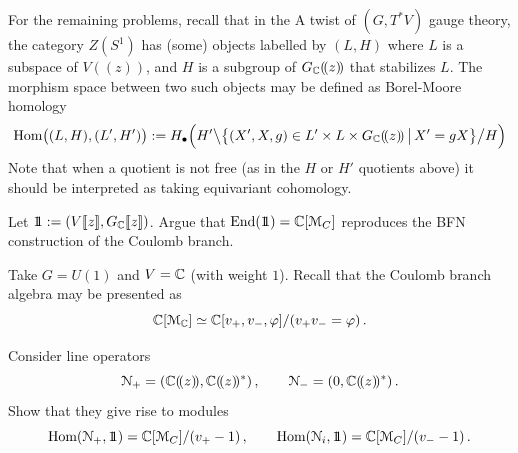 For the remaining problems, recall that in the A twist of $(G,T^*V)$ gauge theory, the category $Z(S^1)$ has (some) objects labelled by $(L,H)$ where $L$ is a subspace of $V(\!(z)\!)$, and $H$ is a subgroup of $G_{\mathbb{C}}(\!(z)\!)$ that stabilizes $L$. The morphism space between two such objects may be defined as Borel-Moore homology
%
$$ \text{Hom}\big((L,H),(L',H')\big) := H_\bullet\Big(  H'\big\backslash\big\{ (X',X,g)\in L'\times L\times G_{\mathbb{C}}(\!(z)\!)\,\big|\, X'=gX\big\}\big/H \Big) $$
%
Note that when a quotient is not free (as in the $H$ or $H'$ quotients above) it should be interpreted as taking equivariant cohomology.

\begin{exercise}

Let $1\!\!1 := (V[\![z]\!],G_{\mathbb{C}}[\![z]\!])$. Argue that $\text{End}(1\!\!1) = \mathbb{C}[\mathcal{M}_C]$ reproduces the BFN construction of the Coulomb branch.

\end{exercise}

\begin{exercise}
Take $G=U(1)$ and $V=\mathbb{C}$ (with weight $1$). Recall that the Coulomb branch algebra may be presented as
%
$$ \mathbb{C}[\mathcal{M}_{\mathbb{C}}] \simeq \mathbb{C}[v_+,v_-,\varphi]/(v_+v_-=\varphi)\,. $$
\end{exercise}
%
Consider line operators
%
$$ \mathcal{N}_+ = (\mathbb{C}(\!(z)\!),\mathbb{C}(\!(z)\!)^*)\,,\qquad  \mathcal{N}_- = (0,\mathbb{C}(\!(z)\!)^*)\,. $$
%
Show that they give rise to modules
%
$$ \text{Hom}(\mathcal{N}_+,1\!\!1) = \mathbb{C}[\mathcal{M}_C]/(v_+-1)\,,\qquad \text{Hom}(\mathcal{N}_i,1\!\!1) = \mathbb{C}[\mathcal{M}_C]/(v_--1)\,. $$

